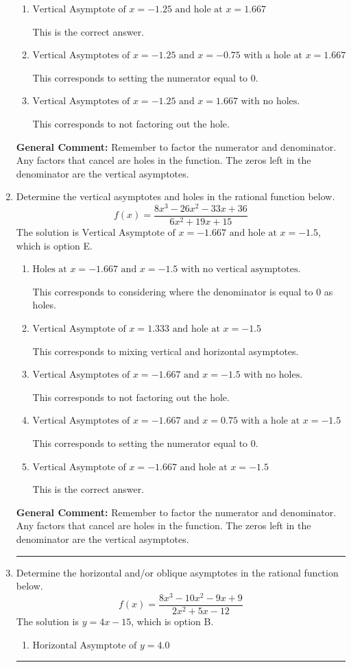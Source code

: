 \documentclass{extbook}[14pt]
\newcommand{\litem}[1]{\item #1

\rule{\textwidth}{0.4pt}}
\begin{document}
\begin{enumerate}
{\begin{enumerate}[label=\Alph*.]
This corresponds to mixing vertical and horizontal asymptotes.
\item \( \text{Vertical Asymptote of } x = -1.25 \text{ and hole at } x = 1.667 \)

This is the correct answer.
\item \( \text{Vertical Asymptotes of } x = -1.25 \text{ and } x = -0.75 \text{ with a hole at } x = 1.667 \)

This corresponds to setting the numerator equal to 0.
\item \( \text{Vertical Asymptotes of } x = -1.25 \text{ and } x = 1.667 \text{ with no holes.} \)

This corresponds to not factoring out the hole.
\end{enumerate}

\textbf{General Comment:} Remember to factor the numerator and denominator. Any factors that cancel are holes in the function. The zeros left in the denominator are the vertical asymptotes.
}
\litem{
Determine the vertical asymptotes and holes in the rational function below.
\[ f(x) = \frac{8x^{3} -26 x^{2} -33 x + 36}{6x^{2} +19 x + 15} \]The solution is \( \text{Vertical Asymptote of } x = -1.667 \text{ and hole at } x = -1.5 \), which is option E.\begin{enumerate}[label=\Alph*.]
\item \( \text{Holes at } x = -1.667 \text{ and } x = -1.5 \text{ with no vertical asymptotes.} \)

This corresponds to considering where the denominator is equal to 0 as holes.
\item \( \text{Vertical Asymptote of } x = 1.333 \text{ and hole at } x = -1.5 \)

This corresponds to mixing vertical and horizontal asymptotes.
\item \( \text{Vertical Asymptotes of } x = -1.667 \text{ and } x = -1.5 \text{ with no holes.} \)

This corresponds to not factoring out the hole.
\item \( \text{Vertical Asymptotes of } x = -1.667 \text{ and } x = 0.75 \text{ with a hole at } x = -1.5 \)

This corresponds to setting the numerator equal to 0.
\item \( \text{Vertical Asymptote of } x = -1.667 \text{ and hole at } x = -1.5 \)

This is the correct answer.
\end{enumerate}

\textbf{General Comment:} Remember to factor the numerator and denominator. Any factors that cancel are holes in the function. The zeros left in the denominator are the vertical asymptotes.
}
\litem{
Determine the horizontal and/or oblique asymptotes in the rational function below.
\[ f(x) = \frac{8x^{3} -10 x^{2} -9 x + 9}{2x^{2} +5 x -12} \]The solution is \( y = 4x -15 \), which is option B.\begin{enumerate}[label=\Alph*.]
\item \( \text{Horizontal Asymptote of } y = 4.0  \)


\end{enumerate}}
\end{enumerate}
\end{document}
